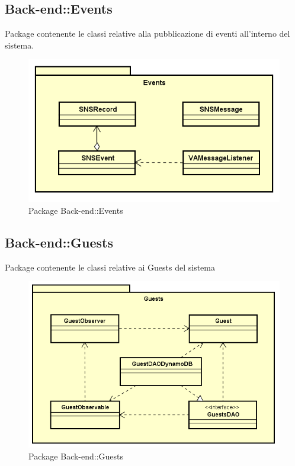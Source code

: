 \subsection{Back-end::Events}
Package contenente le classi relative alla pubblicazione di eventi all'interno del sistema.
\begin{figure}[h] \centering \includegraphics[width=\textwidth,height=\textheight,keepaspectratio]{images/diagrams/back-end/Official_Backend_0304/Events.png}
\caption{Package Back-end::Events}
\end{figure}
\newpage

\subsection{Back-end::Guests}
Package contenente le classi relative ai Guests del sistema
\begin{figure}[h] \centering \includegraphics[width=\textwidth,height=\textheight,keepaspectratio]{images/diagrams/back-end/Official_Backend_0304/Guest.png}
\caption{Package Back-end::Guests}
\end{figure}
\newpage

